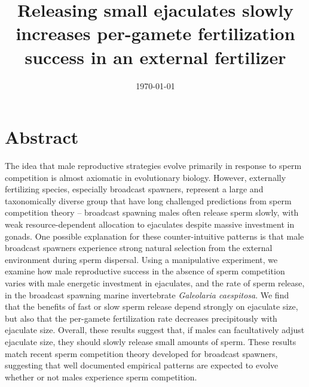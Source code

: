 \documentclass{article}
\title{Releasing small ejaculates slowly increases per-gamete fertilization success in an external fertilizer}
\date{\today}
\begin{document}









\linenumbers
\modulolinenumbers[1]
\renewcommand\linenumberfont{\normalfont\small}
\newpage{}



\section{Abstract}

\noindent{} The idea that male reproductive strategies evolve primarily in response to sperm competition is almost axiomatic in evolutionary biology. However, externally fertilizing species, especially broadcast spawners, represent a large and taxonomically diverse group that have long challenged predictions from sperm competition theory -- broadcast spawning males often release sperm slowly, with weak resource-dependent allocation to ejaculates despite massive investment in gonads. One possible explanation for these counter-intuitive patterns is that male broadcast spawners experience strong natural selection from the external environment during sperm dispersal. Using a manipulative experiment, we examine how male reproductive success in the absence of sperm competition varies with male energetic investment in ejaculates, and the rate of sperm release, in the broadcast spawning marine invertebrate \textit{Galeolaria caespitosa}. We find that the benefits of fast or slow sperm release depend strongly on ejaculate size, but also that the per-gamete fertilization rate decreases precipitously with ejaculate size. Overall, these results suggest that, if males can facultatively adjust ejaculate size, they should slowly release small amounts of sperm. These results match recent sperm competition theory developed for broadcast spawners, suggesting that well documented empirical patterns are expected to evolve whether or not males experience sperm competition.
\end{document}
